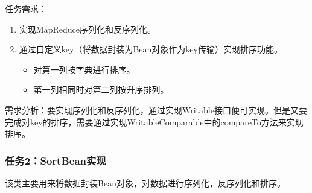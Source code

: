 \documentclass {article}
\begin{document}
				任务需求：
				\begin{enumerate}
					\item 实现MapReduce序列化和反序列化。
					\item 通过自定义key（将数据封装为Bean对象作为key传输）实现排序功能。
					\begin{itemize}
						\item 对第一列按字典进行排序。
						\item 第一列相同时对第二列按升序排列。
					\end{itemize}
				\end{enumerate}
	
				需求分析：要实现序列化和反序列化，通过实现Writable接口便可实现。但是又要完成对key的排序，需要通过实现WritableComparable中的compareTo方法来实现排序。
				
			\subsubsection{任务2：SortBean实现}
				该类主要用来将数据封装Bean对象，对数据进行序列化，反序列化和排序。
			
\end{document}
